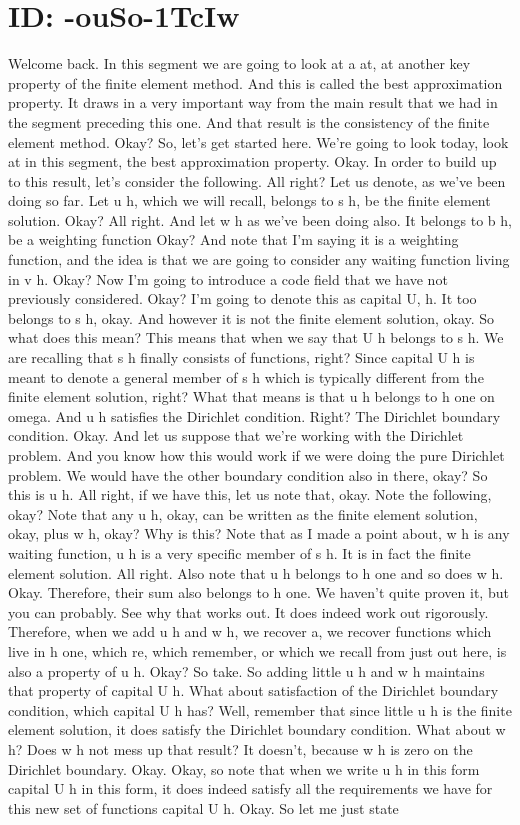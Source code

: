 \documentclass[10pt]{article}
\begin{document}
{\section*{ID: -ouSo-1TcIw}
Welcome back. In this segment we are going to look at a at, at another key property of the finite element method. And this is called the best approximation property. It draws in a very important way from the main result that we had in the segment preceding this one. And that result is the consistency of the finite element method. Okay? So, let's get started here. We're going to look today, look at in this segment, the best approximation property. Okay. In order to build up to this result, let's consider the following. All right? Let us denote, as we've been doing so far. Let u h, which we will recall, belongs to s h, be the finite element solution. Okay? All right. And let w h as we've been doing also. It belongs to b h, be a weighting function Okay? And note that I'm saying it is a weighting function, and the idea is that we are going to consider any waiting function living in v h. Okay? Now I'm going to introduce a code field that we have not previously considered. Okay? I'm going to denote this as capital U, h. It too belongs to s h, okay. And however it is not the finite element solution, okay. So what does this mean? This means that when we say that U h belongs to s h. We are recalling that s h finally consists of functions, right? Since capital U h is meant to denote a general member of s h which is typically different from the finite element solution, right? What that means is that u h belongs to h one on omega. And u h satisfies the Dirichlet condition. Right? The Dirichlet boundary condition. Okay. And let us suppose that we're working with the Dirichlet problem. And you know how this would work if we were doing the pure Dirichlet problem. We would have the other boundary condition also in there, okay? So this is u h. All right, if we have this, let us note that, okay. Note the following, okay? Note that any u h, okay, can be written as the finite element solution, okay, plus w h, okay? Why is this? Note that as I made a point about, w h is any waiting function, u h is a very specific member of s h. It is in fact the finite element solution. All right. Also note that u h belongs to h one and so does w h. Okay. Therefore, their sum also belongs to h one. We haven't quite proven it, but you can probably. See why that works out. It does indeed work out rigorously. Therefore, when we add u h and w h, we recover a, we recover functions which live in h one, which re, which remember, or which we recall from just out here, is also a property of u h. Okay? So take. So adding little u h and w h maintains that property of capital U h. What about satisfaction of the Dirichlet boundary condition, which capital U h has? Well, remember that since little u h is the finite element solution, it does satisfy the Dirichlet boundary condition. What about w h? Does w h not mess up that result? It doesn't, because w h is zero on the Dirichlet boundary. Okay. Okay, so note that when we write u h in this form capital U h in this form, it does indeed satisfy all the requirements we have for this new set of functions capital U h. Okay. So let me just state }
\end{document}
